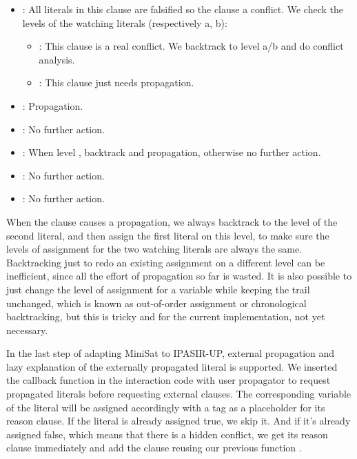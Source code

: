 \begin{itemize}
  \item {}: All literals in this clause are falsified so the clause a conflict. We check the levels of the watching literals (respectively a, b):
  \begin{itemize}
    \item {}: This clause is a real conflict. We backtrack to level a/b and do conflict analysis.
    \item {}: This clause just needs propagation.
  \end{itemize}
  \item {}: Propagation.
  \item {}: No further action.
  \item {}: When level , backtrack and propagation, otherwise no further action.
  \item {}: No further action.
  \item {}: No further action.
\end{itemize}

When the clause causes a propagation, we always backtrack to the level of the second literal, and then assign the first literal on this level, to make sure the levels of assignment for the two watching literals are always the same. Backtracking just to redo an existing assignment on a different level can be inefficient, since all the effort of propagation so far is wasted. It is also possible to just change the level of assignment for a variable while keeping the trail unchanged, which is known as out-of-order assignment or chronological backtracking, but this is tricky and for the current implementation, not yet necessary.

In the last step of adapting MiniSat to IPASIR-UP, external propagation and lazy explanation of the externally propagated literal is supported. We inserted the callback function  in the interaction code with user propagator to request propagated literals before requesting external clauses. The corresponding variable of the literal will be assigned accordingly with a tag  as a placeholder for its reason clause. If the literal is already assigned true, we skip it. And if it's already assigned false, which means that there is a hidden conflict, we get its reason clause immediately and add the clause reusing our previous function .

